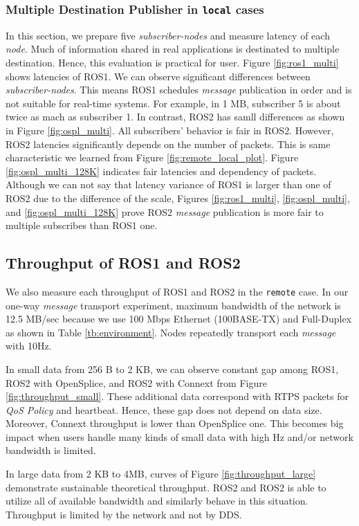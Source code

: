 \documentclass{sig-alternate-05-2015}
\begin{document}
\subsubsection{Multiple Destination Publisher in \texttt{local} cases}
\label{sec:multiple}
In this section, we prepare five \emph{subscriber-nodes} and measure latency of each \emph{node}.
Much of information shared in real applications is destinated to multiple destination.
Hence, this evaluation is practical for user.
Figure \ref{fig:ros1_multi} shows latencies of ROS1.
We can observe significant differences between \emph{subscriber-nodes}.
This means ROS1 schedules \emph{message} publication in order and is not suitable for real-time systems.
For example, in 1 MB, subscriber 5 is about twice as mach as subscriber 1.
In contrast, ROS2 has samll differences as shown in Figure \ref{fig:ospl_multi}.
All subscribers' behavior is fair in ROS2.
However, ROS2 latencies significantly depends on the number of packets.
This is same characteristic we learned from Figure \ref{fig:remote_local_plot}.
Figure \ref{fig:ospl_multi_128K} indicates fair latencies and dependency of packets.
Although we can not say that latency variance of ROS1 is larger than one of ROS2 due to the difference of the scale, Figures \ref{fig:ros1_multi}, \ref{fig:ospl_multi}, and \ref{fig:ospl_multi_128K} prove ROS2 \emph{message} publication is more fair to multiple subscribes than ROS1 one.


\subsection{Throughput of ROS1 and ROS2}
\label{sec:throughput}
We also measure each throughput of ROS1 and ROS2 in the \texttt{remote} case.
In our one-way \emph{message} transport experiment, maximum bandwidth of the network is 12.5 MB/sec because we use 100 Mbps Ethernet (100BASE-TX) and Full-Duplex as shown in Table \ref{tb:environment}.
Nodes repeatedly transport each \emph{message} with 10Hz.

In small data from 256 B to 2 KB, we can observe constant gap among ROS1, ROS2 with OpenSplice, and ROS2 with Connext from Figure \ref{fig:throughput_small}.
These additional data correspond with RTPS packets for \emph{QoS Policy} and heartbeat.
Hence, these gap does not depend on data size.
Moreover, Connext throughput is lower than OpenSplice one.
This becomes big impact when users handle many kinds of small data with high Hz and/or network bandwidth is limited.

In large data from 2 KB to 4MB, curves of Figure \ref{fig:throughput_large} demonstrate sustainable theoretical throughput.
ROS2 and ROS2 is able to utilize all of available bandwidth and similarly behave in this situation.
Throughput is limited by the network and not by DDS.
\end{document}
